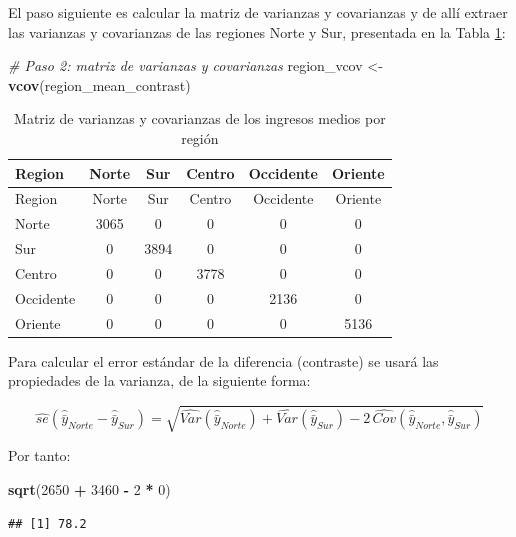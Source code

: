 \documentclass[
  spanish,
  12pt,
]{book}
\newenvironment{Shaded}{\begin{snugshade}}{\end{snugshade}}
\newcommand{\CommentTok}[1]{\textcolor[rgb]{0.56,0.35,0.01}{\textit{#1}}}
\newcommand{\DecValTok}[1]{\textcolor[rgb]{0.00,0.00,0.81}{#1}}
\newcommand{\FunctionTok}[1]{\textcolor[rgb]{0.13,0.29,0.53}{\textbf{#1}}}
\newcommand{\NormalTok}[1]{#1}
\newcommand{\OtherTok}[1]{\textcolor[rgb]{0.56,0.35,0.01}{#1}}
\newcommand{\SpecialCharTok}[1]{\textcolor[rgb]{0.81,0.36,0.00}{\textbf{#1}}}
\begin{document}
El paso siguiente es calcular la matriz de varianzas y covarianzas y de allí extraer las varianzas y covarianzas de las regiones Norte y Sur, presentada en la Tabla \ref{tab:tab-vcov-region}:

\begin{Shaded}
\begin{Highlighting}[]
\CommentTok{\# Paso 2: matriz de varianzas y covarianzas}
\NormalTok{region\_vcov }\OtherTok{\textless{}{-}} \FunctionTok{vcov}\NormalTok{(region\_mean\_contrast)}
\end{Highlighting}
\end{Shaded}

\begin{longtable}[]{@{}lccccc@{}}
\caption{\label{tab:tab-vcov-region}Matriz de varianzas y covarianzas de los ingresos medios por región}\tabularnewline
\toprule\noalign{}
Region & Norte & Sur & Centro & Occidente & Oriente \\
\midrule\noalign{}
\endfirsthead
\toprule\noalign{}
Region & Norte & Sur & Centro & Occidente & Oriente \\
\midrule\noalign{}
\endhead
\bottomrule\noalign{}
\endlastfoot
Norte & 3065 & 0 & 0 & 0 & 0 \\
Sur & 0 & 3894 & 0 & 0 & 0 \\
Centro & 0 & 0 & 3778 & 0 & 0 \\
Occidente & 0 & 0 & 0 & 2136 & 0 \\
Oriente & 0 & 0 & 0 & 0 & 5136 \\
\end{longtable}

Para calcular el error estándar de la diferencia (contraste) se usará las propiedades de la varianza, de la siguiente forma:

\[
\widehat{se}\left(\hat{\bar{y}}_{Norte}-\hat{\bar{y}}_{Sur}\right)=\sqrt{\widehat {Var}\left(\hat{\bar{y}}_{Norte}\right)+
\widehat{Var}\left(\hat{\bar{y}}_{Sur}\right)-
2\, \widehat{Cov}\left(\hat{\bar{y}}_{Norte},\hat{\bar{y}}_{Sur}\right)}
\]

Por tanto:

\begin{Shaded}
\begin{Highlighting}[]
\FunctionTok{sqrt}\NormalTok{(}\DecValTok{2650} \SpecialCharTok{+} \DecValTok{3460} \SpecialCharTok{{-}} \DecValTok{2} \SpecialCharTok{*} \DecValTok{0}\NormalTok{)}
\end{Highlighting}
\end{Shaded}

\begin{verbatim}
## [1] 78.2
\end{verbatim}
\end{document}
